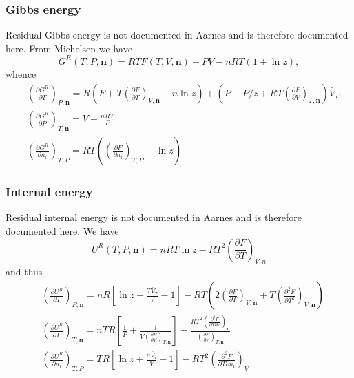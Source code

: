 \documentclass[english]{../thermomemo/thermomemo}
\newcommand{\dd}[2]{\frac{\partial #1}{\partial #2}}
\newcommand{\mbn}[0]{\mathbf n}
\newcommand*{\pder}[2]{\left(\frac{\partial #1}{\partial #2}\right)}
\newcommand*{\pdder}[2]{\left(\frac{\partial^2 #1}{\partial #2^2}\right)}
\newcommand*{\pdersub}[3]{\left(\frac{\partial #1}{\partial #2}\right)_{#3}}
\newcommand*{\pdcross}[3]{\left(\frac{\partial^2 #1}{\partial #2 \partial #3}\right)}
\newcommand{\lp}{\left(}
\newcommand{\rp}{\right)}
\numberwithin{equation}{section}
\begin{document}
\subsubsection*{Gibbs energy}
Residual Gibbs energy is not documented in Aarnes \cite{Aarnes13} and
is therefore documented here. From Michelsen \cite{Michelsen07} we
have
$$
G^R(T,P,\mbn) = RT F(T,V,\mbn) + PV - nRT(1 + \ln z),
$$
whence
\begin{align}
  & \pder{G^R}{T}_{P, \textbf{n}} = R \lp F + T \pdersub{F}{T}{V,\mbn} - n \ln z \rp + \lp P - P/z + RT \pdersub{F}{V}{T,\mbn} \rp \bar{V}_T \\
  & \pder{G^R}{P}_{T, \textbf{n}} = V - \frac{nRT}{P} \\
  & \pder{G^R}{n_i}_{T, P} = RT \lp \pdersub{F}{n_i}{T,P} - \ln z \rp
\end{align}

\subsubsection*{Internal energy}
Residual internal energy is not documented in Aarnes \cite{Aarnes13} and
is therefore documented here. We have
$$
U^R(T,P,\mbn) = nRT \ln z - RT^2 \lp \dd{F}{T} \rp_{V,n}
$$
and thus
\begin{align}
  & \pder{U^R}{T}_{P, \textbf{n}} = nR \left[ \ln z + \frac{T \bar
      V_T}{V} -1 \right] - RT\lp 2 \pder{F}{T}_{V,\mbn} + T\pdder{F}{T}_{V,\mbn} \rp \\
  & \pder{U^R}{P}_{T, \textbf{n}} = nTR\left[ \frac{1}{P} + \frac{1}{V
      \pder{P}{V}_{T,\mbn}} \right] - \frac{RT^2\pdcross{F}{T}{V}_\mbn}{\pder{P}{V}_{T,\mbn}}\\
  & \pder{U^R}{n_i}_{T, P} = TR \left[ \ln z + \frac{n\bar V_i}{V}
    -1\right] - RT^2 \pdcross{F}{T}{n_i}_V
\end{align}
\end{document}
